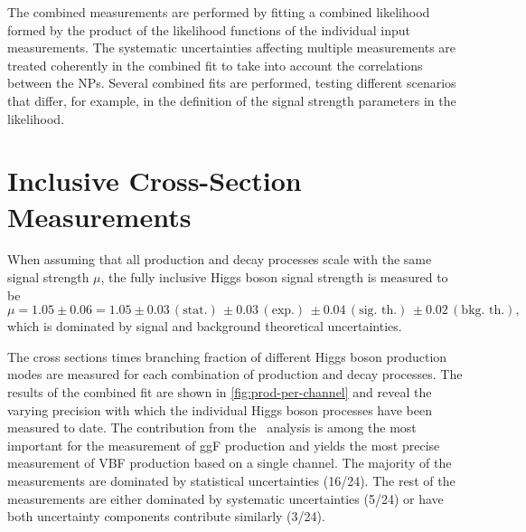 The combined measurements are performed by fitting a combined likelihood formed by the product of the likelihood functions of the individual input measurements. 
The systematic uncertainties affecting multiple measurements are treated coherently in the combined fit to take into account the correlations between the NPs. 
Several combined fits are performed, testing different scenarios that differ, for example, in the definition of the signal strength parameters in the likelihood.


\section{Inclusive Cross-Section Measurements}
When assuming that all production and decay processes scale with the same signal strength $\mu$, the fully inclusive Higgs boson signal strength is measured to be 
\begin{equation*}
   \mu =1.05 \pm 0.06 = 1.05\pm 0.03\, (\text{stat.})\, \pm 0.03\, (\text{exp.})\, \pm 0.04\, (\text{sig.\ th.})\, \pm 0.02\, (\text{bkg.\ th.}),
\end{equation*}
which is dominated by signal and background theoretical uncertainties. 

The cross sections times branching fraction of different Higgs boson production modes are measured for each combination of production and decay processes. 
The results of the combined fit are shown in \cref{fig:prod-per-channel} and reveal the varying precision with which the individual Higgs boson processes have been measured to date. 
The contribution from the \HWW\ analysis is among the most important for the measurement of ggF production and yields the most precise measurement of VBF production based on a single channel.
The majority of the measurements are dominated by statistical uncertainties (16/24). The rest of the measurements are either dominated by systematic uncertainties (5/24) or have both uncertainty components contribute similarly (3/24). 

